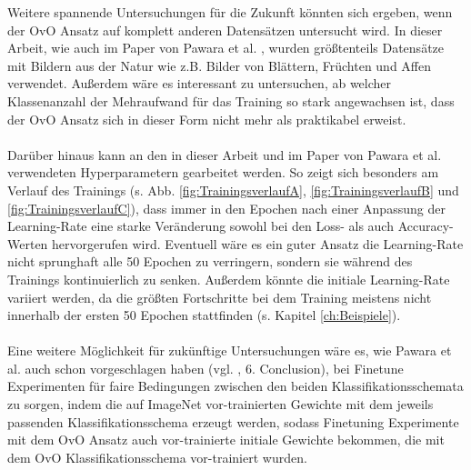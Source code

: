 \newpage

Weitere spannende Untersuchungen für die Zukunft könnten sich ergeben, wenn der OvO Ansatz auf komplett anderen Datensätzen untersucht wird. In dieser Arbeit, wie auch im Paper von Pawara et al. \cite{pawaraPaper}, wurden größtenteils Datensätze mit Bildern aus der Natur wie z.B. Bilder von Blättern, Früchten und Affen verwendet. Außerdem wäre es interessant zu untersuchen, ab welcher Klassenanzahl der Mehraufwand für das Training so stark angewachsen ist, dass der OvO Ansatz sich in dieser Form nicht mehr als praktikabel erweist.\\\\

Darüber hinaus kann an den in dieser Arbeit und im Paper von Pawara et al. \cite{pawaraPaper} verwendeten Hyperparametern gearbeitet werden. So zeigt sich besonders am Verlauf des Trainings (s. Abb. \ref{fig:TrainingsverlaufA}, \ref{fig:TrainingsverlaufB} und \ref{fig:TrainingsverlaufC}), dass immer in den Epochen nach einer Anpassung der Learning-Rate eine starke Veränderung sowohl bei den Loss- als auch Accuracy-Werten hervorgerufen wird. Eventuell wäre es ein guter Ansatz die Learning-Rate nicht sprunghaft alle 50 Epochen zu verringern, sondern sie während des Trainings kontinuierlich zu senken. Außerdem könnte die initiale Learning-Rate variiert werden, da die größten Fortschritte bei dem Training meistens nicht innerhalb der ersten 50 Epochen stattfinden (s. Kapitel \ref{ch:Beispiele}).\\\\

Eine weitere Möglichkeit für zukünftige Untersuchungen wäre es, wie Pawara et al. auch schon vorgeschlagen haben (vgl. \cite{pawaraPaper}, 6. Conclusion), bei Finetune Experimenten für faire Bedingungen zwischen den beiden Klassifikationsschemata zu sorgen, indem die auf ImageNet \cite{imagenet} vor-trainierten Gewichte mit dem jeweils passenden Klassifikationsschema erzeugt werden, sodass Finetuning Experimente mit dem OvO Ansatz auch vor-trainierte initiale Gewichte bekommen, die mit dem OvO Klassifikationsschema vor-trainiert wurden.
